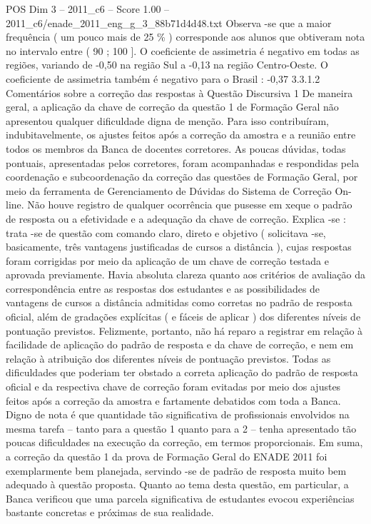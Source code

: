 \begin{textsample}{POS Dim 3 – 2011\_c6 – Score 1.00 – 2011\_c6/enade\_2011\_eng\_g\_3\_88b71d4d48.txt}
Observa -se que a maior frequência ( um pouco mais de 25 \% ) corresponde aos alunos que obtiveram nota no intervalo entre ( 90 ; 100 ].
O coeficiente de assimetria é negativo em todas as regiões, variando de -0,50 na região Sul a -0,13 na região Centro-Oeste.
O coeficiente de assimetria também é negativo para o Brasil : -0,37 3.3.1.2 Comentários sobre a correção das respostas à Questão Discursiva 1 De maneira geral, a aplicação da chave de correção da questão 1 de Formação Geral não apresentou qualquer dificuldade digna de menção.
Para isso contribuíram, indubitavelmente, os ajustes feitos após a correção da amostra e a reunião entre todos os membros da Banca de docentes corretores.
As poucas dúvidas, todas pontuais, apresentadas pelos corretores, foram acompanhadas e respondidas pela coordenação e subcoordenação da correção das questões de Formação Geral, por meio da ferramenta de Gerenciamento de Dúvidas do Sistema de Correção On-line.
Não houve registro de qualquer ocorrência que pusesse em xeque o padrão de resposta ou a efetividade e a adequação da chave de correção.
Explica -se : trata -se de questão com comando claro, direto e objetivo ( solicitava -se, basicamente, três vantagens justificadas de cursos a distância ), cujas respostas foram corrigidas por meio da aplicação de um chave de correção testada e aprovada previamente.
Havia absoluta clareza quanto aos critérios de avaliação da correspondência entre as respostas dos estudantes e as possibilidades de vantagens de cursos a distância admitidas como corretas no padrão de resposta oficial, além de gradações explícitas ( e fáceis de aplicar ) dos diferentes níveis de pontuação previstos.
Felizmente, portanto, não há reparo a registrar em relação à facilidade de aplicação do padrão de resposta e da chave de correção, e nem em relação à atribuição dos diferentes níveis de pontuação previstos.
Todas as dificuldades que poderiam ter obstado a correta aplicação do padrão de resposta oficial e da respectiva chave de correção foram evitadas por meio dos ajustes feitos após a correção da amostra e fartamente debatidos com toda a Banca.
Digno de nota é que quantidade tão significativa de profissionais envolvidos na mesma tarefa – tanto para a questão 1 quanto para a 2 – tenha apresentado tão poucas dificuldades na execução da correção, em termos proporcionais.
Em suma, a correção da questão 1 da prova de Formação Geral do ENADE 2011 foi exemplarmente bem planejada, servindo -se de padrão de resposta muito bem adequado à questão proposta.
Quanto ao tema desta questão, em particular, a Banca verificou que uma parcela significativa de estudantes evocou experiências bastante concretas e próximas de sua realidade.

\end{textsample}

